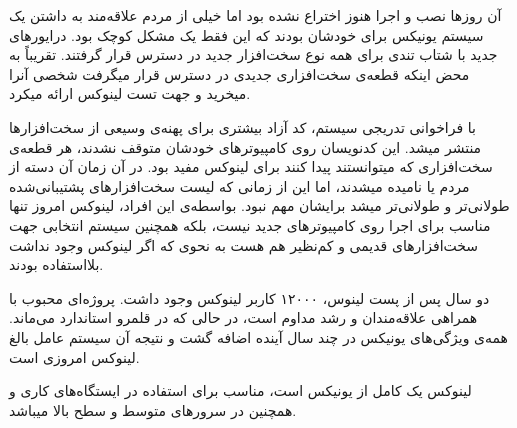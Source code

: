 آن روزها نصب و اجرا
هنوز اختراع نشده بود اما خیلی از مردم علاقه‌مند به داشتن یک سیستم یونیکس برای خودشان بودند که این فقط یک مشکل کوچک بود. درایورهای جدید با شتاب تندی برای همه نوع سخت‌افزار جدید در دسترس قرار گرفتند. تقریباً به محض اینکه قطعه‌ی سخت‌افزاری جدیدی در دسترس قرار میگرفت شخصی آنرا میخرید و جهت تست لینوکس ارائه میکرد.

با فراخوانی تدریجی سیستم، کد آزاد بیشتری برای پهنه‌ی وسیعی از سخت‌افزارها منتشر میشد. این کدنویسان روی کامپیوترهای خودشان متوقف نشدند، هر قطعه‌ی سخت‌افزاری که میتوانستند پیدا کنند برای لینوکس مفید بود.
در آن زمان آن دسته از مردم 
 یا 
 نامیده میشدند، اما این از زمانی که لیست سخت‌افزارهای پشتیبانی‌شده طولانی‌تر و طولانی‌تر میشد برایشان مهم نبود. بواسطه‌ی این افراد، لینوکس امروز تنها مناسب برای اجرا روی کامپیوترهای جدید نیست، بلکه همچنین سیستم انتخابی جهت سخت‌افزارهای قدیمی و کم‌نظیر هم هست به نحوی که اگر لینوکس وجود نداشت بلااستفاده بودند.
 
دو سال پس از پست لینوس، ۱۲۰۰۰ کاربر لینوکس وجود داشت. پروژه‌ای محبوب با همراهی علاقه‌مندان و رشد مداوم است، در حالی که در قلمرو استاندارد 
 می‌ماند. همه‌ی ویژگی‌های یونیکس در چند سال آینده اضافه گشت و نتیجه آن سیستم عامل بالغ لینوکس امروزی است.
 
 لینوکس یک 
 کامل از یونیکس است، مناسب برای استفاده در ایستگاه‌های کاری و همچنین در سرورهای متوسط و سطح بالا میباشد.
